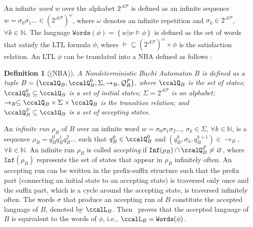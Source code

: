 \documentclass[Afour,sageh,times]{sagej}
\newtheorem{defn}[thm]{Definition}
\begin{document}
An infinite \textit{word} $w$ over the alphabet $2^{\mathcal{AP}}$ is defined as an infinite sequence  $w=\sigma_0\sigma_1\ldots\in (2^{\mathcal{AP}})^{\omega}$, where $\omega$ denotes an infinite repetition and $\sigma_k\in2^{\mathcal{AP}}$, $\forall k\in\mathbb{N}$. The language $\texttt{Words}(\phi)=\left\{w|w\models\phi\right\}$ is defined as the set of words that satisfy the LTL formula $\phi$, where $\models\subseteq (2^{\mathcal{AP}})^{\omega}\times\phi$ is the satisfaction relation. An LTL $\phi$ can be translated into a NBA  defined as follows \cite{vardi1986automata}:
\begin{defn}[(NBA)]\label{def:nba}
  A \textit{Nondeterministic B$\ddot{\text{u}}$chi Automaton} $B$ is defined as a tuple $B=\left(\ccalQ_{B}, \ccalQ_{B}^0,\Sigma,\rightarrow_B,\mathcal{Q}_B^F\right)$, where $\ccalQ_{B}$ is the set of states; $\ccalQ_{B}^0\subseteq\ccalQ_{B}$ is a set of initial states; $\Sigma=2^{\mathcal{AP}}$ is an alphabet;  $\rightarrow_{B}\subseteq\ccalQ_{B}\times \Sigma\times\ccalQ_{B}$ is the transition relation;
and $\ccalQ_B^F\subseteq\ccalQ_{B}$ is a set of accepting states.
\end{defn}

An \textit{infinite run} $\rho_B$ of $B$ over an infinite word $w=\sigma_0\sigma_1\sigma_2\dots$, $\sigma_k\in\Sigma$, $\forall k\in\mathbb{N}$, is a sequence $\rho_B=q_B^0q_B^1q_B^2\dots$ such that $q_B^0\in\ccalQ_B^0$ and $(q_B^{k},\sigma_k,q_B^{k+1})\in\rightarrow_{B}$, $\forall k\in\mathbb{N}$.
An infinite run $\rho_B$ is called \textit{accepting} if $\texttt{Inf}(\rho_B)\cap\ccalQ_B^F\neq\varnothing$, where $\texttt{Inf}(\rho_B)$ represents the set of states that appear in $\rho_B$ infinitely often. An accepting run can be written in the prefix-suffix structure such that the prefix part (connecting an initial state to an  accepting state) is traversed only once and the suffix part, which is a cycle around the accepting state, is traversed infinitely often.
The words $\sigma$ that produce an accepting run of $B$ constitute the accepted language of $B$, denoted by $\ccalL_B$. Then~\cite{baier2008principles} proves that the accepted language of $B$ is equivalent to the words of $\phi$, i.e., $\ccalL_B=\texttt{Words}(\phi)$.
\end{document}
